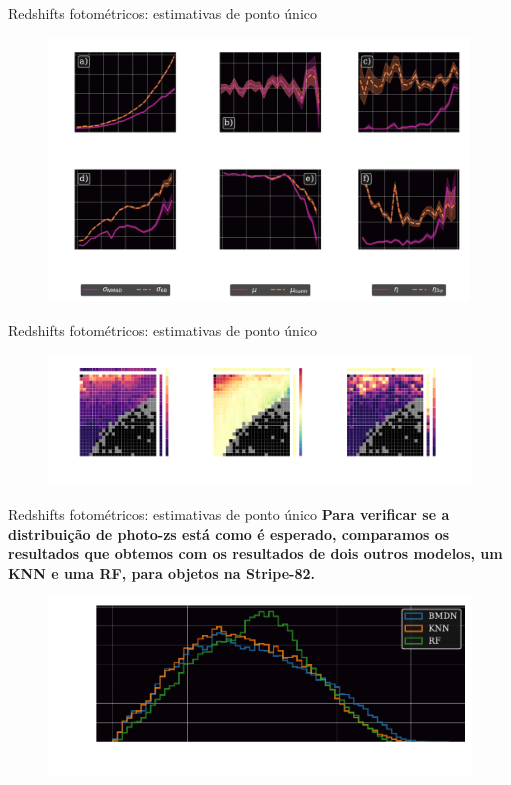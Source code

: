 \begin{frame}[c]{Redshifts fotométricos: estimativas de ponto único}
    \begin{figure}
        \centering
        \includegraphics[height=7cm]{script/images/results_spe_metrics.pdf}
    \end{figure}
\end{frame}

\begin{frame}[c]{Redshifts fotométricos: estimativas de ponto único}
    \begin{figure}
        \centering
        \includegraphics[width=\linewidth]{script/images/results_spe_metrics_2d.pdf}
    \end{figure}
\end{frame}

\begin{frame}[c]{Redshifts fotométricos: estimativas de ponto único}
    \textbf{Para verificar se a distribuição de photo-zs está como é esperado, comparamos os resultados que obtemos com os resultados de dois outros modelos, um KNN e uma RF, para objetos na Stripe-82.}

    \begin{figure}
        \centering
        \includegraphics[width=0.8\linewidth]{script/images/s82_redshifts.pdf}
    \end{figure}
\end{frame}

